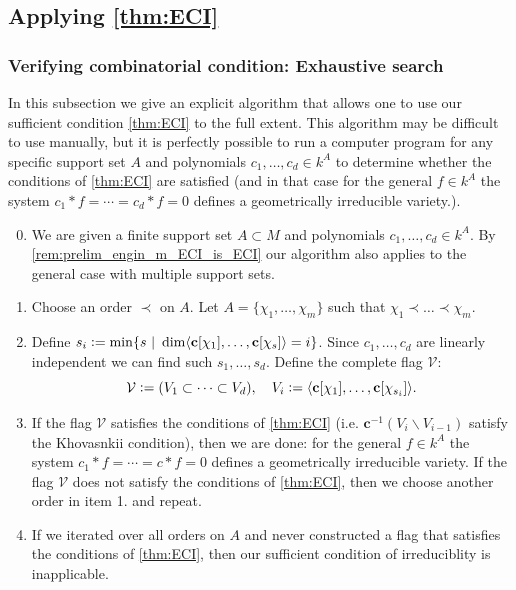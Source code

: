 \subsection{Applying \autoref{thm:ECI}}\label{ssec:ECI_other}
\subsubsection{Verifying combinatorial condition: Exhaustive search}
In this subsection we give an explicit algorithm that allows one to use our sufficient condition \autoref{thm:ECI} to the full extent. This algorithm may be difficult to use manually, but it is perfectly possible to run a computer program for any specific support set $A$ and polynomials $c_1, \dots, c_d \in k^A$ to determine whether the conditions of \autoref{thm:ECI} are satisfied (and in that case for the general $f \in k^A$ the system $c_1 * f = \cdots = c_d * f = 0$ defines a geometrically irreducible variety.).
\begin{enumerate}
    \setcounter{enumi}{-1}
    \item We are given a finite support set $A \subset M$ and polynomials $c_1, \dots, c_d \in k^A$. By \autoref{rem:prelim_engin_m_ECI_is_ECI} our algorithm also applies to the general case with multiple support sets.
    
    \item Choose an order $\prec$ on $A$. Let $A = \{ \chi_1, \dots, \chi_m \}$ such that $\chi_1 \prec \dots \prec \chi_m$.

    \item Define $s_i \vcentcolon= \min \{ s\ |\ \dim \langle \mathbf c[\chi_1], \dots, \mathbf c[\chi_s] \rangle = i \}$. Since $c_1, \dots, c_d$ are linearly independent we can find such $s_1, \dots, s_d$. Define the complete flag $\mathcal V$:
    \[
    \mathcal V \vcentcolon= (V_1 \subset \cdots \subset V_d), \quad V_i \vcentcolon= \langle \mathbf c[\chi_1], \dots, \mathbf c[\chi_{s_i}] \rangle.
    \]
    
    \item If the flag $\mathcal V$ satisfies the conditions of \autoref{thm:ECI} (i.e. $\mathbf c^{-1} (V_i \backslash V_{i - 1})$ satisfy the Khovasnkii condition), then we are done: for the general $f \in k^A$ the system $c_1 * f = \cdots = c * f = 0$ defines a geometrically irreducible variety. If the flag $\mathcal V$ does not satisfy the conditions of \autoref{thm:ECI}, then we choose another order in item 1. and repeat.

    \item If we iterated over all orders on $A$ and never constructed a flag that satisfies the conditions of \autoref{thm:ECI}, then our sufficient condition of irreduciblity is inapplicable.
\end{enumerate}


